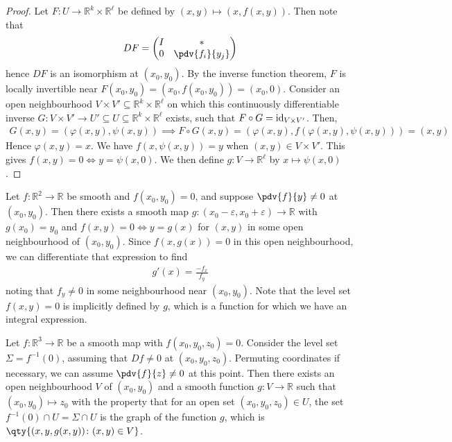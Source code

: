 \begin{proof}
	Let $F \colon U \to \mathbb R^k \times \mathbb R^\ell$ be defined by $(x,y) \mapsto (x,f(x,y))$.
	Then note that
	\begin{align*}
		DF = \begin{pmatrix}
			I & \ast           \\
			0 & \pdv{f_i}{y_j}
		\end{pmatrix}
	\end{align*}
	hence $DF$ is an isomorphism at $(x_0, y_0)$.
	By the inverse function theorem, $F$ is locally invertible near $F(x_0,y_0) = (x_0,f(x_0,y_0)) = (x_0, 0)$.
	Consider an open neighbourhood $V \times V' \subseteq \mathbb R^k \times \mathbb R^\ell$ on which this continuously differentiable inverse $G \colon V \times V' \to U' \subseteq U \subseteq \mathbb R^k \times \mathbb R^\ell$ exists, such that $F \circ G = \operatorname{id}_{V \times V'}$.
	Then,
	\begin{align*}
		G(x,y) = (\varphi(x,y), \psi(x,y)) \implies F \circ G(x,y) = (\varphi(x,y), f(\varphi(x,y), \psi(x,y))) = (x,y)
	\end{align*}
	Hence $\varphi(x,y) = x$.
	We have $f(x,\psi(x,y)) = y$ when $(x,y) \in V \times V'$.
	This gives $f(x,y) = 0 \iff y = \psi(x,0)$.
	We then define $g \colon V \to \mathbb R^\ell$ by $x \mapsto \psi(x,0)$.
\end{proof}
\begin{example}
	Let $f \colon \mathbb R^2 \to \mathbb R$ be smooth and $f(x_0, y_0) = 0$, and suppose $\pdv{f}{y} \neq 0$ at $(x_0, y_0)$.
	Then there exists a smooth map $g \colon (x_0 - \varepsilon, x_0 + \varepsilon) \to \mathbb R$ with $g(x_0) = y_0$ and $f(x,y) = 0 \iff y = g(x)$ for $(x,y)$ in some open neighbourhood of $(x_0, y_0)$.
	Since $f(x,g(x)) = 0$ in this open neighbourhood, we can differentiate that expression to find
	\begin{align*}
		g'(x) = \frac{-f_x}{f_y}
	\end{align*}
	noting that $f_y \neq 0$ in some neighbourhood near $(x_0, y_0)$.
	Note that the level set $f(x,y) = 0$ is implicitly defined by $g$, which is a function for which we have an integral expression.
\end{example}
\begin{example}
	Let $f \colon \mathbb R^3 \to \mathbb R$ be a smooth map with $f(x_0, y_0, z_0) = 0$.
	Consider the level set $\Sigma = f^{-1}(0)$, assuming that $Df \neq 0$ at $(x_0, y_0, z_0)$.
	Permuting coordinates if necessary, we can assume $\pdv{f}{z} \neq 0$ at this point.
	Then there exists an open neighbourhood $V$ of $(x_0, y_0)$ and a smooth function $g \colon V \to \mathbb R$ such that $(x_0, y_0) \mapsto z_0$ with the property that for an open set $(x_0, y_0, z_0) \in U$, the set $f^{-1}(0) \cap U = \Sigma \cap U$ is the graph of the function $g$, which is $\qty{ (x,y,g(x,y)) \colon (x,y) \in V }$.
\end{example}

